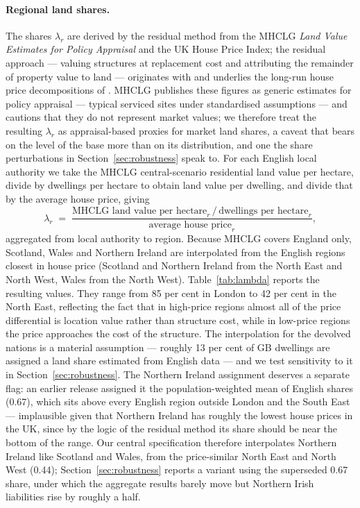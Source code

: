 \paragraph{Regional land shares.} The shares $\lambda_r$ are derived by the residual method from the MHCLG \emph{Land Value Estimates for Policy Appraisal} \citep{mhclg2023} and the UK House Price Index; the residual approach --- valuing structures at replacement cost and attributing the remainder of property value to land --- originates with \citet{davis2007} and underlies the long-run house price decompositions of \citet{knoll2017}. MHCLG publishes these figures as generic estimates for policy appraisal --- typical serviced sites under standardised assumptions --- and cautions that they do not represent market values; we therefore treat the resulting $\lambda_r$ as appraisal-based proxies for market land shares, a caveat that bears on the level of the base more than on its distribution, and one the share perturbations in Section~\ref{sec:robustness} speak to. For each English local authority we take the MHCLG central-scenario residential land value per hectare, divide by dwellings per hectare to obtain land value per dwelling, and divide that by the average house price, giving
\begin{equation}
\lambda_r \;=\; \frac{\text{MHCLG land value per hectare}_r \,/\, \text{dwellings per hectare}_r}{\text{average house price}_r},
\label{eq:lambda}
\end{equation}
aggregated from local authority to region. Because MHCLG covers England only, Scotland, Wales and Northern Ireland are interpolated from the English regions closest in house price (Scotland and Northern Ireland from the North East and North West, Wales from the North West). Table~\ref{tab:lambda} reports the resulting values. They range from 85 per cent in London to 42 per cent in the North East, reflecting the fact that in high-price regions almost all of the price differential is location value rather than structure cost, while in low-price regions the price approaches the cost of the structure. The interpolation for the devolved nations is a material assumption --- roughly 13 per cent of GB dwellings are assigned a land share estimated from English data --- and we test sensitivity to it in Section~\ref{sec:robustness}. The Northern Ireland assignment deserves a separate flag: an earlier release assigned it the population-weighted mean of English shares (0.67), which sits above every English region outside London and the South East --- implausible given that Northern Ireland has roughly the lowest house prices in the UK, since by the logic of the residual method its share should be near the bottom of the range. Our central specification therefore interpolates Northern Ireland like Scotland and Wales, from the price-similar North East and North West (0.44); Section~\ref{sec:robustness} reports a variant using the superseded 0.67 share, under which the aggregate results barely move but Northern Irish liabilities rise by roughly a half.

